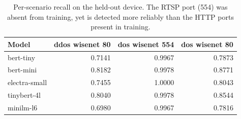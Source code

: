 \begin{table}[htbp]
\centering
\caption{Per-scenario recall on the held-out device. The RTSP port (554) was absent from training, yet is detected more reliably than the HTTP ports present in training.}
\label{tab:per-scenario}
\small
\begin{tabular}{lrrr}
\toprule
Model & ddos wisenet 80 & dos wisenet 554 & dos wisenet 80 \\
\midrule
bert-tiny & 0.7141 & 0.9967 & 0.7873 \\
bert-mini & 0.8182 & 0.9978 & 0.8771 \\
electra-small & 0.7455 & 1.0000 & 0.8043 \\
tinybert-4l & 0.8040 & 0.9978 & 0.8544 \\
minilm-l6 & 0.6980 & 0.9967 & 0.7816 \\
\bottomrule
\end{tabular}
\end{table}

